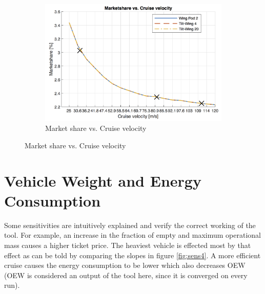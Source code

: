 \begin{figure}[h]
\begin{subfigure}[t]{0.33\textwidth}
    \includegraphics[width=\textwidth]{Chapters/cruise_marketshare.png}
    \captionsetup{justification=centering}
    \caption{Market share vs. Cruise velocity}
    \label{fig:sens9}
\end{subfigure}
\captionsetup{justification=centering}
\end{figure}

\section{Vehicle Weight and Energy Consumption}
Some sensitivities are intuitively explained and verify the correct working of the tool. For example, an increase in the fraction of empty and maximum operational mass causes a higher ticket price. The heaviest vehicle is effected most by that effect as can be told by comparing the slopes in figure \ref{fig:sens4}. A more efficient cruise causes the energy consumption to be lower which also decreases OEW (OEW is considered an output of the tool here, since it is converged on every run). 

